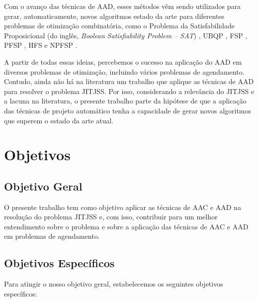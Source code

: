 Com o avanço das técnicas de \ac{AAD}, esses métodos vêm sendo utilizados para gerar, automaticamente, novos algoritmos estado da arte para diferentes problemas de otimização combinatória, como o Problema da Satisfabilidade Proposicional (do inglês, \textit{Boolean Satisfiability Problem -- \acs{SAT}}) \citep{khudabukhsh2016satenstein}, \ac{UBQP} \citep{de2018automatic, de2018automatically}, \ac{FSP} \citep{brum2018automatic}, \ac{PFSP} \citep{marmion2013automatic, pagnozzi2019automatic}, \ac{HFS} \citep{alfaro2020automatic} e \ac{NPFSP} \citep{brum2022automatic}.

A partir de todas essas ideias, percebemos o sucesso na aplicação do \ac{AAD} em diversos problemas de otimização, incluindo vários problemas de agendamento. Contudo, ainda não há na literatura um trabalho que aplique as técnicas de \ac{AAD} para resolver o problema \ac{JITJSS}. Por isso, considerando a relevância do \ac{JITJSS} e a lacuna na literatura, o presente trabalho parte da hipótese de que a aplicação das técnicas de projeto automático tenha a capacidade de gerar novos algoritmos que superem o estado da arte atual. 

\section{Objetivos}

\subsection{Objetivo Geral}

O presente trabalho tem como objetivo aplicar as técnicas de \ac{AAC} e \ac{AAD} na resolução do problema \ac{JITJSS} e, com isso, contribuir para um melhor entendimento sobre o problema e sobre a aplicação das técnicas de \ac{AAC} e \ac{AAD} em problemas de agendamento.

\subsection{Objetivos Específicos}

Para atingir o nosso objetivo geral, estabelecemos os seguintes objetivos específicos:

